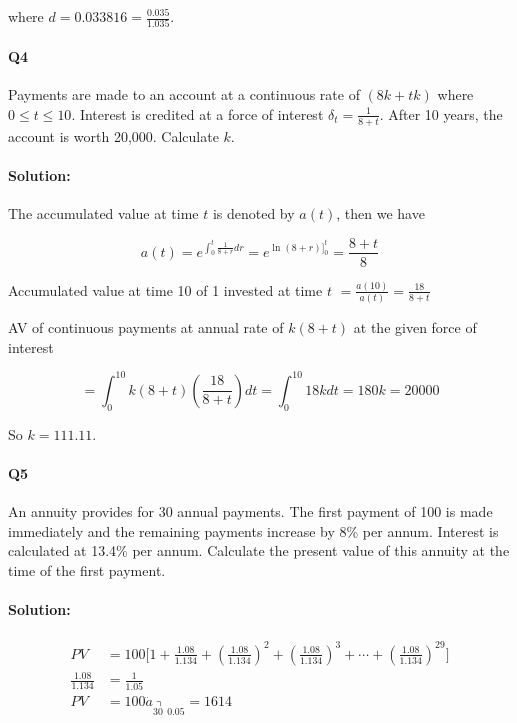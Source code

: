 \documentclass[a4paper, 11pt, twoside]{article}
\begin{document}
where $d=0.033816=\frac{0.035}{1.035}.$\\

\paragraph{Q4} Payments are made to an account at a continuous rate of $(8k+tk)$ where $0\leq t\leq 10$. Interest is credited at a force of interest $\delta_t=\frac{1}{8+t}$. After 10 years, the account is worth 20,000. Calculate $k$.\\

\paragraph{Solution:} The accumulated value at time $t$ is denoted by $a(t)$, then we have

\[a(t)=e^{\int^t_0\frac{1}{8+r}dr}=e^{\ln(8+r)\big]^t_0}=\frac{8+t}{8}\]

Accumulated value at time 10 of 1 invested at time $t$ $=\frac{a(10)}{a(t)}=\frac{18}{8+t}$

AV of continuous payments at annual rate of $k(8+t)$ at the given force of interest

\[=\int^{10}_0k(8+t)\left(\frac{18}{8+t}\right)dt=\int^{10}_0 18kdt=180k=20000\]

So $k=111.11$.\\

\paragraph{Q5} An annuity provides for 30 annual payments. The first payment of 100 is made immediately and the remaining payments increase by 8\% per annum. Interest is calculated at 13.4\% per annum. Calculate the present value of this annuity at the time of the first payment.\\

\paragraph{Solution:}

\[\begin{split}
PV &= 100\big[1+\frac{1.08}{1.134} + \left(\frac{1.08}{1.134}\right)^2+\left(\frac{1.08}{1.134}\right)^3+\cdots+\left(\frac{1.08}{1.134}\right)^{29}\big]\\
\frac{1.08}{1.134}&=\frac{1}{1.05}\\
PV&= 100\ddot{a}_{\annuity{30\ \ }0.05}=1614\\
\end{split}
\]
\end{document}
